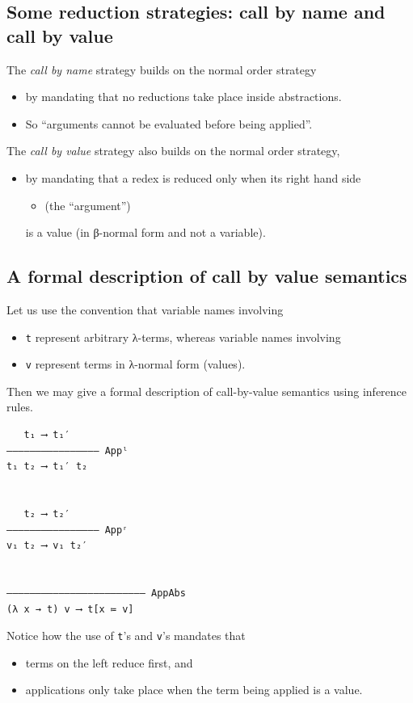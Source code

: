\documentclass[11pt]{article}
\theoremstyle{definition}
\begin{document}
\subsection{Some reduction strategies: call by name and call by value}
\label{sec:org4aff36a}
The \emph{call by name} strategy builds on the normal order strategy
\begin{itemize}
\item by mandating that no reductions take place inside abstractions.
\item So “arguments cannot be evaluated before being applied”.
\end{itemize}

The \emph{call by value} strategy also builds on the normal order strategy,
\begin{itemize}
\item by mandating that a redex is reduced only when its right hand side
\begin{itemize}
\item (the “argument”)
\end{itemize}
is a value (in β-normal form and not a variable).
\end{itemize}

\subsection{A formal description of call by value semantics}
\label{sec:org7394385}

Let us use the convention that variable names involving
\begin{itemize}
\item \texttt{t} represent arbitrary λ-terms, whereas variable names involving
\item \texttt{v} represent terms in λ-normal form (values).
\end{itemize}

Then we may give a formal description of call-by-value semantics
using inference rules.
\begin{verbatim}
   t₁ ⟶ t₁′
–––––––––––––––– Appˡ
t₁ t₂ ⟶ t₁′ t₂


   t₂ ⟶ t₂′
–––––––––––––––– Appʳ
v₁ t₂ ⟶ v₁ t₂′

   
–––––––––––––––––––––––– AppAbs
(λ x → t) v ⟶ t[x ≔ v]
\end{verbatim}
Notice how the use of \texttt{t}'s and \texttt{v}'s mandates that
\begin{itemize}
\item terms on the left reduce first, and
\item applications only take place when the term being applied is a value.
\end{itemize}
\end{document}
